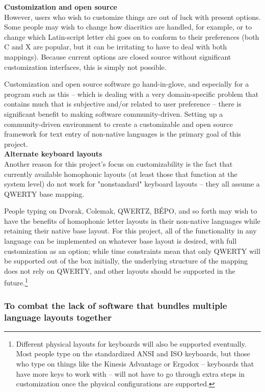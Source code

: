 \documentclass[11pt]{article}
\begin{document}
\noindent \textbf{Customization and open source} \\

However, users who wish to customize things are out of luck with present options. Some people may wish to change how diacritics are handled, for example, or to change which Latin-script letter chi goes on to conform to their preferences (both C and X are popular, but it can be irritating to have to deal with both mappings). Because current options are closed source without significant customization interfaces, this is simply not possible.

Customization and open source software go hand-in-glove, and especially for a program such as this -- which is dealing with a very domain-specific problem that contains much that is subjective and/or related to user preference -- there is significant benefit to making software community-driven. Setting up a community-driven environment to create a customizable and open source framework for text entry of non-native languages is the primary goal of this project. \\

\noindent \textbf{Alternate keyboard layouts} \\

Another reason for this project's focus on customizability is the fact that currently available homophonic layouts (at least those that function at the system level) do not work for "nonstandard" keyboard layouts -- they all assume a QWERTY base mapping.

People typing on Dvorak, Colemak, QWERTZ, BÉPO, and so forth may wish to have the benefits of homophonic letter layouts in their non-native languages while retaining their native base layout. For this project, all of the functionality in any language can be implemented on whatever base layout is desired, with full customization as an option; while time constraints mean that only QWERTY will be supported out of the box initially, the underlying structure of the mapping does not rely on QWERTY, and other layouts should be supported in the future.\footnote{Different physical layouts for keyboards will also be supported eventually. Most people type on the standardized ANSI and ISO keyboards, but those who type on things like the Kinesis Advantage or Ergodox -- keyboards that have more keys to work with -- will not have to go through extra steps in customization once the physical configurations are supported.}

\subsubsection{To combat the lack of software that bundles multiple language layouts together}
\label{sec:orgbbd7f70}
\end{document}
